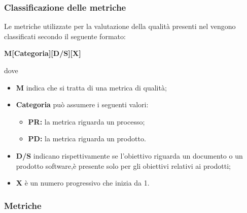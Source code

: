 \subsubsection{Classificazione delle metriche}
Le metriche utilizzate per la valutazione della qualità presenti nel \PdQv{} vengono classificati secondo il seguente formato:
\begin{center}
	\textbf{M[Categoria][D/S][X]}
\end{center}
dove 
\begin{itemize}
	\item \textbf{M} indica che si tratta di una metrica di qualità;
	\item \textbf{Categoria} può assumere i seguenti valori:
	\begin{itemize}
		\item \textbf{PR:} la metrica riguarda un processo;
		\item \textbf{PD:} la metrica riguarda un prodotto.
	\end{itemize}
	\item \textbf{D/S} indicano rispettivamente se l'obiettivo riguarda un documento o un prodotto software,è presente solo per gli obiettivi relativi ai prodotti;
	\item \textbf{X} è un numero progressivo che inizia da 1.
\end{itemize}
\subsubsection{Metriche}